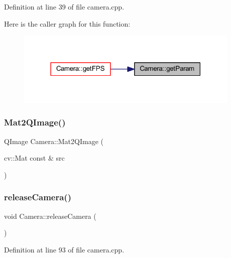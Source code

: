 Definition at line 39 of file camera.\+cpp.

Here is the caller graph for this function\+:
\nopagebreak
\begin{figure}[H]
\begin{center}
\leavevmode
\includegraphics[width=303pt]{classCamera_ab906269480057a5634f0760b3598e71f_icgraph}
\end{center}
\end{figure}
\mbox{\label{classCamera_ae24eefae4557e25d1582f40ead4a36cb}} 
\subsubsection{\texorpdfstring{Mat2QImage()}{Mat2QImage()}}
{\footnotesize\ttfamily Q\+Image Camera\+::\+Mat2\+Q\+Image (\begin{DoxyParamCaption}\item[{cv\+::\+Mat const \&}]{src }\end{DoxyParamCaption})\hspace{0.3cm}{\ttfamily [private]}}

\mbox{\label{classCamera_a08ea14c11fdb3be4a43d84db0bd1f9e5}} 
\subsubsection{\texorpdfstring{releaseCamera()}{releaseCamera()}}
{\footnotesize\ttfamily void Camera\+::release\+Camera (\begin{DoxyParamCaption}{ }\end{DoxyParamCaption})}



Definition at line 93 of file camera.\+cpp.

